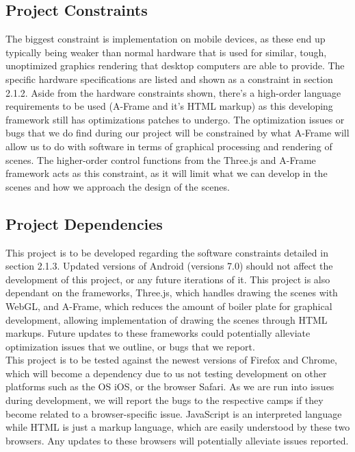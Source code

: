\documentclass[letterpaper,10pt,titlepage,draftclsnofoot,onecolumn,compsoc,utf8,latin1]{IEEEtran}
\begin{document}
\subsection{Project Constraints}
\begin{singlespace}
\noindent
The biggest constraint is implementation on mobile devices, as these end up typically being weaker than normal hardware that is used for similar, tough, unoptimized graphics rendering that desktop computers are able to provide. The specific hardware specifications are listed and shown as a constraint in section 2.1.2. Aside from the hardware constraints shown, there's a high-order language requirements to be used (A-Frame and it's HTML markup) as this developing framework still has optimizations patches to undergo. The optimization issues or bugs that we do find during our project will be constrained by what A-Frame will allow us to do with software in terms of graphical processing and rendering of scenes. The higher-order control functions from the Three.js and A-Frame framework acts as this constraint, as it will limit what we can develop in the scenes and how we approach the design of the scenes.
\end{singlespace}

\subsection{Project Dependencies}
\begin{singlespace}
\noindent
This project is to be developed regarding the software constraints detailed in section 2.1.3. Updated versions of Android (versions  7.0) should not affect the development of this project, or any future iterations of it. This project is also dependant on the frameworks, Three.js, which handles drawing the scenes with WebGL, and A-Frame, which reduces the amount of boiler plate for graphical development, allowing implementation of drawing the scenes through HTML markups. Future updates to these frameworks could potentially alleviate optimization issues that we outline, or bugs that we report. \\

\noindent
This project is to be tested against the newest versions of Firefox and Chrome, which will become a dependency due to us not testing development on other platforms such as the OS iOS, or the browser Safari. As we are run into issues during development, we will report the bugs to the respective camps if they become related to a browser-specific issue. JavaScript is an interpreted language while HTML is just a markup language, which are easily understood by these two browsers. Any updates to these browsers will potentially alleviate issues reported.
\end{singlespace}
\end{document}
